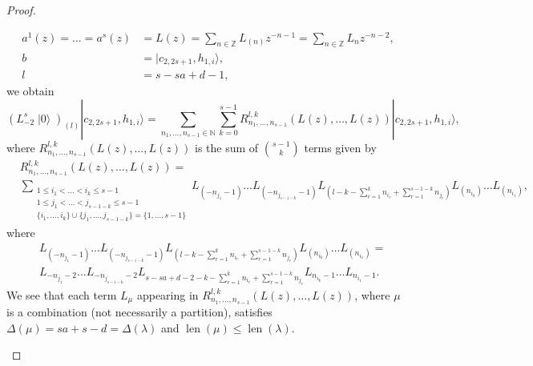 \documentclass[a4paper, 12pt, reqno]{amsart}
\theoremstyle{remark}
\DeclareMathOperator{\len}{len}
\DeclareMathOperator{\vac}{|0\rangle}
\begin{document}
\begin{proof}
\begin{enumerate}
\begin{align*}
      a^1(z) = \dots = a^s(z) &= L(z) = \sum_{n \in \mathbb{Z}}L_{(n)}z^{-n - 1} = \sum_{n \in \mathbb{Z}}L_nz^{-n - 2}, \\
      b &= |c_{2, 2s + 1}, h_{1, i}\rangle, \\
      l &= s - sa + d - 1,
    \end{align*}
    we obtain
    \begin{equation}
      \label{eq:7}
      (L_{-2}^s\vac)_{(l)}|c_{2, 2s + 1}, h_{1, i}\rangle = \sum_{n_1, \dots, n_{s - 1} \in \mathbb{N}}\sum_{k = 0}^{s - 1}R^{l, k}_{n_1, \dots, n_{s - 1}}(L(z), \dots, L(z))|c_{2, 2s + 1}, h_{1, i}\rangle,
    \end{equation}
    where $R^{l, k}_{n_1, \dots, n_{s - 1}}(L(z), \dots, L(z))$ is the sum of $\binom{s - 1}{k}$ terms given by
    \begin{align*}
      &R^{l, k}_{n_1, \dots, n_{s - 1}}(L(z), \dots, L(z)) = \\
      &\sum_{\substack{1 \le i_1 < \dots < i_k \le s - 1 \\ 1 \le j_1 < \dots < j_{s - 1 - k} \le s - 1 \\ \{i_1, \dots, i_k\} \cup \{j_1, \dots, j_{s - 1 - k}\} = \{1, \dots, s - 1\}}}L_{(-n_{j_1} - 1)}\dots L_{(-n_{j_{s - 1 - k}} - 1)}L_{(l - k - \sum_{r = 1}^kn_{i_r} + \sum_{r = 1}^{s - 1 - k}n_{j_r})}L_{(n_{i_k})}\dots L_{(n_{i_1})},
    \end{align*}
    where
    \begin{align*}
      &L_{(-n_{j_1} - 1)}\dots L_{(-n_{j_{s - 1 - k}} - 1)}L_{(l - k - \sum_{r = 1}^kn_{i_r} + \sum_{r = 1}^{s - 1 - k}n_{j_r})}L_{(n_{i_k})}\dots L_{(n_{i_1})} = \\
      &L_{-n_{j_1} - 2}\dots L_{-n_{j_{s - 1 - k}} - 2}L_{s - sa + d - 2 - k - \sum_{r = 1}^kn_{i_r} + \sum_{r = 1}^{s - 1 - k}n_{j_r}}L_{n_{i_k} - 1}\dots L_{n_{i_1} - 1}.
    \end{align*}
    We see that each term $L_{\mu}$ appearing in $R^{l, k}_{n_1, \dots, n_{s - 1}}(L(z), \dots, L(z))$, where $\mu$ is a combination (not necessarily a partition), satisfies $\Delta(\mu) = sa + s - d = \Delta(\lambda)$ and $\len(\mu) \le \len(\lambda)$.


\end{enumerate}
\end{proof}
\end{document}
